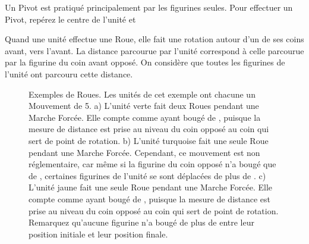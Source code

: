 Un Pivot est pratiqué principalement par les figurines seules. Pour effectuer un Pivot, repérez le centre de l'unité et 

Quand une unité effectue une Roue, elle fait une rotation autour d'un de ses coins avant, vers l'avant. La distance parcourue par l'unité correspond à celle parcourue par la figurine du coin avant opposé. On considère que toutes les figurines de l'unité ont parcouru cette distance.

\newcommand{\wheelsA}{a)}
\newcommand{\wheelsB}{b)}
\newcommand{\wheelsC}{c)}

\begin{figure}[!htbp]
\centering
\def\svgwidth{\textwidth}

\caption{Exemples de Roues.\vspace*{10pt}\newline
Les unités de cet exemple ont chacune un Mouvement de 5.\vspace*{10pt}\newline
a) L'unité verte fait deux Roues pendant une Marche Forcée. Elle compte comme ayant bougé de , puisque la mesure de distance est prise au niveau du coin opposé au coin qui sert de point de rotation.\vspace*{10pt}\newline
b) L'unité turquoise fait une seule Roue pendant une Marche Forcée. Cependant, ce mouvement est non réglementaire, car même si la figurine du coin opposé n'a bougé que de , certaines figurines de l'unité se sont déplacées de plus de .\vspace*{10pt}\newline
c) L'unité jaune fait une seule Roue pendant une Marche Forcée. Elle compte comme ayant bougé de , puisque la mesure de distance est prise au niveau du coin opposé au coin qui sert de point de rotation. Remarquez qu'aucune figurine n'a bougé de plus de  entre leur position initiale et leur position finale.}
\label{figure/wheels}
\end{figure}

